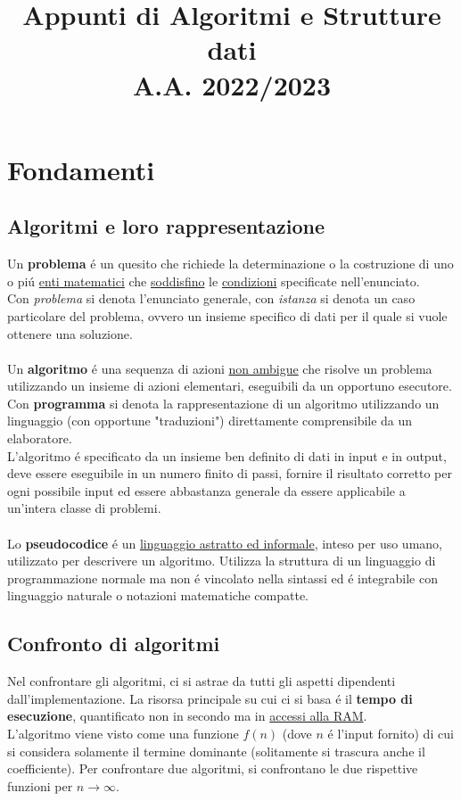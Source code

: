 \documentclass{article}
\title{
	Appunti di Algoritmi e Strutture dati \\
	\large A.A. 2022/2023
}
\date{}
\begin{document}
\maketitle

\section{Fondamenti}

\subsection{Algoritmi e loro rappresentazione}
Un \textbf{problema} é un quesito che richiede la determinazione o la costruzione di uno o piú \underline{enti matematici} che \underline{soddisfino} le \underline{condizioni} specificate nell'enunciato.\\
Con \textit{problema} si denota l'enunciato generale, con \textit{istanza} si denota un caso particolare del problema, ovvero un insieme specifico di dati per il quale si vuole ottenere una soluzione.\\\\
Un \textbf{algoritmo} é una sequenza di azioni \underline{non ambigue} che risolve un problema utilizzando un insieme di azioni elementari, eseguibili da un opportuno esecutore. Con \textbf{programma} si denota la rappresentazione di un algoritmo utilizzando un linguaggio (con opportune "traduzioni") direttamente comprensibile da un elaboratore.\\
L'algoritmo é specificato da un insieme ben definito di dati in input e in output, deve essere eseguibile in un numero finito di passi, fornire il risultato corretto per ogni possibile input ed essere abbastanza generale da essere applicabile a un'intera classe di problemi.\\\\
Lo \textbf{pseudocodice} é un \underline{linguaggio astratto ed informale}, inteso per uso umano, utilizzato per descrivere un algoritmo. Utilizza la struttura di un linguaggio di programmazione normale ma non é vincolato nella sintassi ed é integrabile con linguaggio naturale o notazioni matematiche compatte.

\subsection{Confronto di algoritmi}
Nel confrontare gli algoritmi, ci si astrae da tutti gli aspetti dipendenti dall'implementazione. La risorsa principale su cui ci si basa é il \textbf{tempo di esecuzione}, quantificato non in secondo ma in \underline{accessi alla RAM}.\\
L'algoritmo viene visto come una funzione $f(n)$ (dove $n$ é l'input fornito) di cui si considera solamente il termine dominante (solitamente si trascura anche il coefficiente). Per confrontare due algoritmi, si confrontano le due rispettive funzioni per $n \to \infty$.
\end{document}
